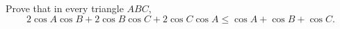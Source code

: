 Prove that in every triangle $ABC$,
\[
2\cos A\cos B+2\cos B\cos C+2\cos C\cos A\le\cos A+\cos B+\cos C .
\]
